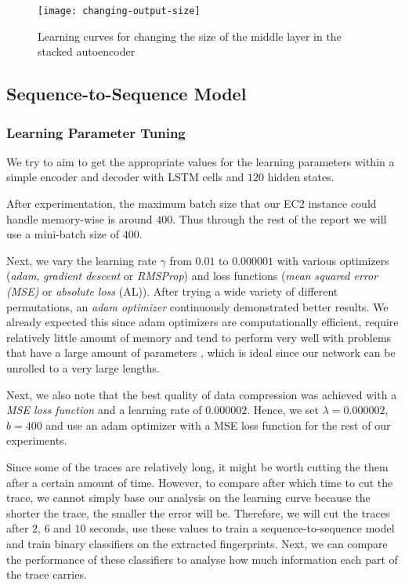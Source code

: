 \begin{figure}[ht]
  \centering
  \texttt{[image: changing-output-size]}
  \caption{Learning curves for changing the size of the middle layer in the stacked autoencoder}
  \label{fig:changing-output-size}
\end{figure}

\newpage

\subsection{Sequence-to-Sequence Model}

\subsubsection{Learning Parameter Tuning}

We try to aim to get the appropriate values for the learning parameters within a simple encoder and decoder with LSTM cells and $120$ hidden states.

After experimentation, the maximum batch size that our EC2 instance could handle memory-wise is around $400$.
Thus through the rest of the report we will use a mini-batch size of $400$.

Next, we vary the learning rate $\gamma$ from $0.01$ to $0.000001$ with various optimizers (\textit{adam}, \textit{gradient descent} or \textit{RMSProp}) and loss functions (\textit{mean squared error (MSE)} or \textit{absolute loss} (AL)).
After trying a wide variety of different permutations, an \textit{adam optimizer} continuously demonstrated better results.
We already expected this since adam optimizers are computationally efficient, require relatively little amount of memory and tend to perform very well with problems that have a large amount of parameters \cite{kingma2014adam},
which is ideal since our network can be unrolled to a very large lengths.

Next, we also note that the best quality of data compression was achieved with a \textit{MSE loss function} and a learning rate of $0.000002$.
Hence, we set $\lambda = 0.000002$, $b = 400$ and use an adam optimizer with a MSE loss function for the rest of our experiments.

Since some of the traces are relatively long, it might be worth cutting the them after a certain amount of time.
However, to compare after which time to cut the trace, we cannot simply base our analysis on the learning curve because the shorter the trace, the smaller the error will be.
Therefore, we will cut the traces after $2$, $6$ and $10$ seconds, use these values to train a sequence-to-sequence model and train binary classifiers on the extracted fingerprints.
Next, we can compare the performance of these classifiers to analyse how much information each part of the trace carries.

